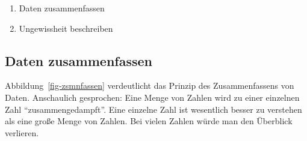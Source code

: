 \documentclass[
  a4paper,
]{scrbook}
\providecommand{\tightlist}{%
  \setlength{\itemsep}{0pt}\setlength{\parskip}{0pt}}\usepackage{longtable,booktabs,array}
\theoremstyle{definition}
\theoremstyle{definition}
\theoremstyle{definition}
\theoremstyle{remark}
\begin{document}
\begin{enumerate}
\def\labelenumi{\arabic{enumi}.}
\tightlist
\item
  Daten zusammenfassen
\item
  Ungewissheit beschreiben
\end{enumerate}

\subsection{Daten zusammenfassen}\label{daten-zusammenfassen}

Abbildung~\ref{fig-zsmnfassen} verdeutlicht das Prinzip des
Zusammenfassens von Daten. Anschaulich gesprochen: Eine Menge von Zahlen
wird zu einer einzelnen Zahl ``zusammengedampft''. Eine einzelne Zahl
ist wesentlich besser zu verstehen als eine große Menge von Zahlen. Bei
vielen Zahlen würde man den Überblick verlieren.
\end{document}
